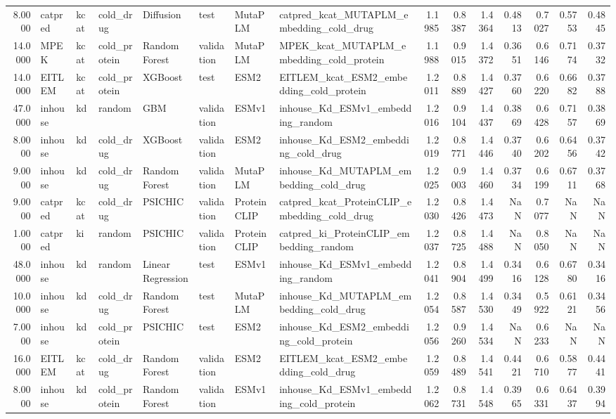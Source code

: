 \begin{tabular}{rlllllllrrrrrrr}
8.0000 & catpred & kcat & cold_drug & Diffusion & test & MutaPLM & catpred_kcat_MUTAPLM_embedding_cold_drug & 1.1985 & 0.8387 & 1.4364 & 0.4813 & 0.7027 & 0.5753 & 0.4845 \\
14.0000 & MPEK & kcat & cold_protein & Random Forest & validation & MutaPLM & MPEK_kcat_MUTAPLM_embedding_cold_protein & 1.1988 & 0.9015 & 1.4372 & 0.3651 & 0.6146 & 0.7174 & 0.3732 \\
14.0000 & EITLEM & kcat & cold_protein & XGBoost & test & ESM2 & EITLEM_kcat_ESM2_embedding_cold_protein & 1.2011 & 0.8889 & 1.4427 & 0.3760 & 0.6220 & 0.6682 & 0.3788 \\
47.0000 & inhouse & kd & random & GBM & validation & ESMv1 & inhouse_Kd_ESMv1_embedding_random & 1.2016 & 0.9104 & 1.4437 & 0.3869 & 0.6428 & 0.7157 & 0.3869 \\
8.0000 & inhouse & kd & cold_drug & XGBoost & validation & ESM2 & inhouse_Kd_ESM2_embedding_cold_drug & 1.2019 & 0.8771 & 1.4446 & 0.3740 & 0.6202 & 0.6456 & 0.3742 \\
9.0000 & inhouse & kd & cold_drug & Random Forest & validation & MutaPLM & inhouse_Kd_MUTAPLM_embedding_cold_drug & 1.2025 & 0.9003 & 1.4460 & 0.3734 & 0.6199 & 0.6711 & 0.3768 \\
9.0000 & catpred & kcat & cold_drug & PSICHIC & validation & ProteinCLIP & catpred_kcat_ProteinCLIP_embedding_cold_drug & 1.2030 & 0.8426 & 1.4473 & NaN & 0.7077 & NaN & NaN \\
1.0000 & catpred & ki & random & PSICHIC & validation & ProteinCLIP & catpred_ki_ProteinCLIP_embedding_random & 1.2037 & 0.8725 & 1.4488 & NaN & 0.8050 & NaN & NaN \\
48.0000 & inhouse & kd & random & Linear Regression & test & ESMv1 & inhouse_Kd_ESMv1_embedding_random & 1.2041 & 0.8904 & 1.4499 & 0.3416 & 0.6128 & 0.6780 & 0.3416 \\
10.0000 & inhouse & kd & cold_drug & Random Forest & test & MutaPLM & inhouse_Kd_MUTAPLM_embedding_cold_drug & 1.2054 & 0.8587 & 1.4530 & 0.3449 & 0.5922 & 0.6121 & 0.3456 \\
7.0000 & inhouse & kd & cold_protein & PSICHIC & test & ESM2 & inhouse_Kd_ESM2_embedding_cold_protein & 1.2056 & 0.9260 & 1.4534 & NaN & 0.6233 & NaN & NaN \\
16.0000 & EITLEM & kcat & cold_drug & Random Forest & validation & ESM2 & EITLEM_kcat_ESM2_embedding_cold_drug & 1.2059 & 0.8489 & 1.4541 & 0.4421 & 0.6710 & 0.5877 & 0.4441 \\
8.0000 & inhouse & kd & cold_protein & Random Forest & validation & ESMv1 & inhouse_Kd_ESMv1_embedding_cold_protein & 1.2062 & 0.8731 & 1.4548 & 0.3965 & 0.6331 & 0.6437 & 0.3994 \\

\end{tabular}
